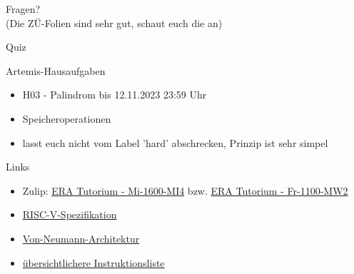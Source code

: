 \documentclass[
  german,            %
  aspectratio=169,    %
]{tumbeamer}
\begin{document}
\begin{frame}[c]{}{}
  \begin{center}
    \LARGE Fragen?\\
    \Large (Die ZÜ-Folien sind sehr gut, schaut euch die an)
  \end{center}
\end{frame}
\begin{frame}[c]{}{}
  \begin{center}
    \LARGE Quiz
  \end{center}
\end{frame}

\begin{frame}[c]{Artemis-Hausaufgaben}{}
  \begin{itemize}
    \item H03 - Palindrom bis 12.11.2023 23:59 Uhr
    \item Speicheroperationen
    \item lasst euch nicht vom Label 'hard' abschrecken, Prinzip ist sehr simpel
  \end{itemize}
\end{frame}

\begin{frame}[fragile, c]{Links}{}
  \begin{itemize}
    \item Zulip: \href{https://zulip.in.tum.de/#narrow/stream/1917-ERA-Tutorium---Mi-1600-MI4}{\glqq ERA Tutorium - Mi-1600-MI4\grqq}
    bzw. \href{https://zulip.in.tum.de/#narrow/stream/1940-ERA-Tutorium---Fr-1100-MW2}{\glqq ERA Tutorium - Fr-1100-MW2\grqq}
    \item \href{https://riscv.org/wp-content/uploads/2017/05/riscv-spec-v2.2.pdf}{RISC-V-Spezifikation}
    \item \href{https://www.geeksforgeeks.org/computer-organization-von-neumann-architecture/}{Von-Neumann-Architektur}
    \item \href{https://msyksphinz-self.github.io/riscv-isadoc/html/rvi.html}{übersichtlichere Instruktionsliste}
  \end{itemize}
\end{frame}

\maketitle
\end{document}
